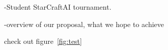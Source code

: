 -Student StarCraftAI tournament.

-overview of our proposal, what we hope to achieve

check out figure~\ref{fig:test}